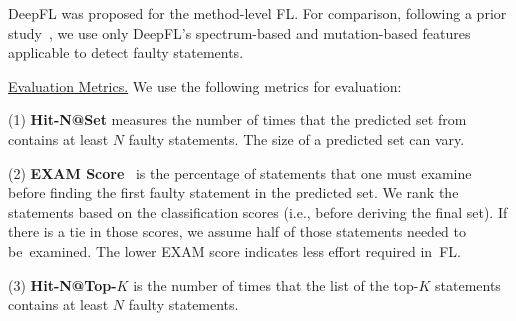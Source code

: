 

DeepFL was proposed for the method-level FL. For comparison, following
a prior study~\cite{icse21-fl}, we use only DeepFL's spectrum-based
and mutation-based features applicable to detect faulty statements.


\underline{Evaluation Metrics.}  
We use the following metrics for evaluation:

(1) {\bf Hit-N@Set} measures the number of times that the predicted
set from {\tool} contains at least $N$ faulty statements. The size of a
predicted set can vary.


(2) {\bf EXAM Score}~\cite{wong2008crosstab} is the percentage of
statements that one must examine before finding the first
faulty statement in the predicted set. We rank the statements based on
the classification scores (i.e., before deriving the final set).
If there is a tie in those scores, we assume half of
those statements needed to be~examined. The lower EXAM score indicates
less effort required in~FL.

(3) {\bf Hit-N@Top-$K$} is the number of times that the list of the top-$K$
statements contains at least $N$ faulty statements.



